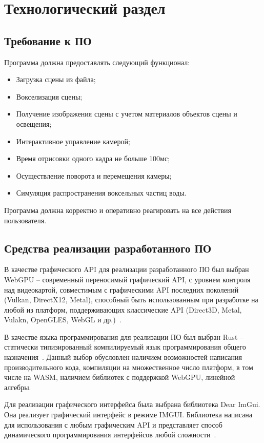 \chapter{Технологический раздел}

\section{Требование к ПО}

Программа должна предоставлять следующий функционал:
\begin{itemize}[label*=---]
    \item Загрузка сцены из файла;
    \item Вокселизация сцены;
    \item Получение изображения сцены с учетом материалов объектов сцены и освещения;
    \item Интерактивное управление камерой;
    \item Время отрисовки одного кадра не больше 100мс;
    \item Осуществление поворота и перемещения камеры;
    \item Симуляция распространения воксельных частиц воды.
\end{itemize}

Программа должна корректно и оперативно реагировать на все действия пользователя.

\section{Средства реализации разработанного ПО}

В качестве графического API для реализации разработанного ПО 
был выбран WebGPU -- современный переносимый графический
API, с уровнем контроля над видеокартой, совместимым с графическими API последних поколений 
(Vulkan, DirectX12, Metal), способный быть использованным при разработке на любой из платформ, 
поддерживающих классические API (Direct3D, Metal, Vulakn, OpenGLES, WebGL и др.)~\cite{WebGPU}.

В качестве языка программирования для реализации ПО был выбран Rust -- 
статически типизированный компилируемый язык программирования общего назначения~\cite{Rust}.
Данный выбор обусловлен наличием возможностей написания производительного кода, 
компиляции на множественное число платформ, в том числе на WASM, наличием
библиотек с поддержкой WebGPU, линейной алгебры.

Для реализации графического интерфейса была выбрана библиотека Dear ImGui.
Она реализует графический интерфейс в режиме IMGUI. Библиотека написана 
для использования с любым графическим API и представляет способ динамического 
программирования интерфейсов любой сложности~\cite{ImGui}.

